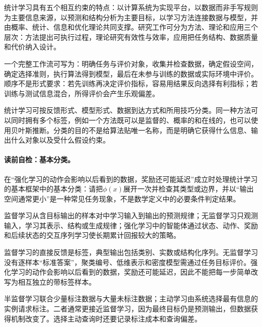 统计学习具有五个相互约束的特点：以计算系统为实现平台，以数据而非手写规则为主要信息来源，以预测和结构分析为主要目标，以学习方法连接数据与模型，并由概率、统计、信息和优化理论共同支撑。研究工作可分为方法、理论和应用三个层次：方法提出可执行过程，理论研究有效性与效率，应用把任务结构、数据质量和代价纳入设计。

一个完整工作流可写为：明确任务与评价对象，收集并检查数据，确定假设空间，确定选择准则，执行算法得到模型，最后在未参与训练的数据或实际环境中评价。顺序不是形式要求：若先训练再决定评价指标，容易用结果反向选择有利指标；若训练与测试信息混合，所得评价会产生乐观偏差。


统计学习可按反馈形式、模型形式、数据到达方式和所用技巧分类。同一种方法可以同时拥有多个标签，例如一个方法既可以是监督的、概率的和在线的，也可以使用贝叶斯推断。分类的目的不是给算法贴唯一名称，而是明确它获得什么信息、输出什么对象以及受什么假设约束。

\paragraph{读前自检：基本分类。}在“强化学习的动作会影响以后看到的数据，奖励还可能延迟”成立时处理统计学习的基本框架中的基本分类：请把$\phi(x)$展开一次并检查其类型或边界，并以“输出空间通常更小”是一种常见任务现象，不是数学定义中的必要条件判定结果。\par

\begin{definition}[三类基本学习问题]\label{def:V1-C09-three-learning-types}
监督学习从含目标输出的样本对中学习输入到输出的预测规律；无监督学习只观测输入，学习其表示、结构或生成规律；强化学习中的智能体通过状态、动作、奖励和后续状态的交互序列学习使长期累计回报较大的策略。
\end{definition}

监督学习的直接反馈是标签，典型输出包括类别、实数或结构化序列。无监督学习没有逐样本“标准答案”，聚类编号、低维表示和密度模型需通过任务目标评价。强化学习的动作会影响以后看到的数据，奖励还可能延迟，因此不能把每一步简单改写为相互独立的带标签样本。

半监督学习联合少量标注数据与大量未标注数据；主动学习由系统选择最有信息的实例请求标注。二者通常更接近监督学习，因为最终目标仍是预测输出，但数据获得机制改变了。选择主动查询时还要记录标注成本和查询偏差。


